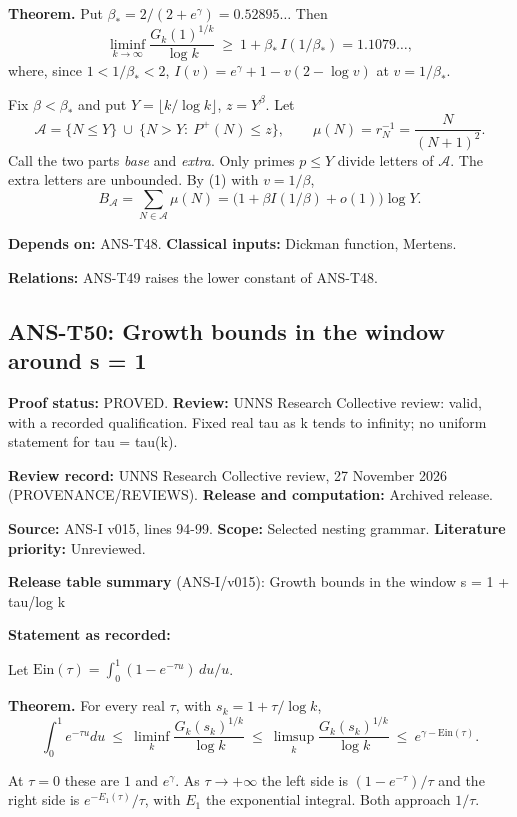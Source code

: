 \documentclass[
  11pt,
]{article}
\begin{document}
\textbf{Theorem.} Put \(\beta_*=2/(2+e^{\gamma})=0.52895\ldots\) Then
\[\liminf_{k\to\infty}\frac{G_k(1)^{1/k}}{\log k}\ \ge\ 1+\beta_*\,I(1/\beta_*)=1.1079\ldots,\]
where, since \(1<1/\beta_*<2\), \(I(v)=e^{\gamma}+1-v(2-\log v)\) at
\(v=1/\beta_*\).

Fix \(\beta<\beta_*\) and put \(Y=\lfloor k/\log k\rfloor\),
\(z=Y^{\beta}\). Let
\[\mathcal A=\{N\le Y\}\ \cup\ \{N>Y:\ P^+(N)\le z\},\qquad\mu(N)=r_N^{-1}=\frac N{(N+1)^2}.\]
Call the two parts \emph{base} and \emph{extra}. Only primes \(p\le Y\)
divide letters of \(\mathcal A\). The extra letters are unbounded. By
(1) with \(v=1/\beta\),
\[B_{\mathcal A}=\sum_{N\in\mathcal A}\mu(N)=\big(1+\beta I(1/\beta)+o(1)\big)\log Y.\]

\textbf{Depends on:} ANS-T48. \textbf{Classical inputs:} Dickman
function, Mertens.

\textbf{Relations:} ANS-T49 raises the lower constant of ANS-T48.

\hypertarget{ans-t50-growth-bounds-in-the-window-around-s-1}{%
\subsection{ANS-T50: Growth bounds in the window around s =
1}\label{ans-t50-growth-bounds-in-the-window-around-s-1}}

\textbf{Proof status:} PROVED. \textbf{Review:} UNNS Research Collective
review: valid, with a recorded qualification. Fixed real tau as k tends
to infinity; no uniform statement for tau = tau(k).

\textbf{Review record:} UNNS Research Collective review, 27 November
2026 (PROVENANCE/REVIEWS). \textbf{Release and computation:} Archived
release.

\textbf{Source:} ANS-I v015, lines 94-99. \textbf{Scope:} Selected
nesting grammar. \textbf{Literature priority:} Unreviewed.

\textbf{Release table summary} (ANS-I/v015): Growth bounds in the window
s = 1 + tau/log k

\textbf{Statement as recorded:}

Let \(\mathrm{Ein}(\tau)=\int_0^1(1-e^{-\tau u})\,du/u\).

\textbf{Theorem.} For every real \(\tau\), with \(s_k=1+\tau/\log k\),
\[\int_0^1e^{-\tau u}du\ \le\ \liminf_k\frac{G_k(s_k)^{1/k}}{\log k}\ \le\ \limsup_k\frac{G_k(s_k)^{1/k}}{\log k}\ \le\ e^{\gamma-\mathrm{Ein}(\tau)} .\]

At \(\tau=0\) these are \(1\) and \(e^{\gamma}\). As \(\tau\to+\infty\)
the left side is \((1-e^{-\tau})/\tau\) and the right side is
\(e^{-E_1(\tau)}/\tau\), with \(E_1\) the exponential integral. Both
approach \(1/\tau\).
\end{document}
